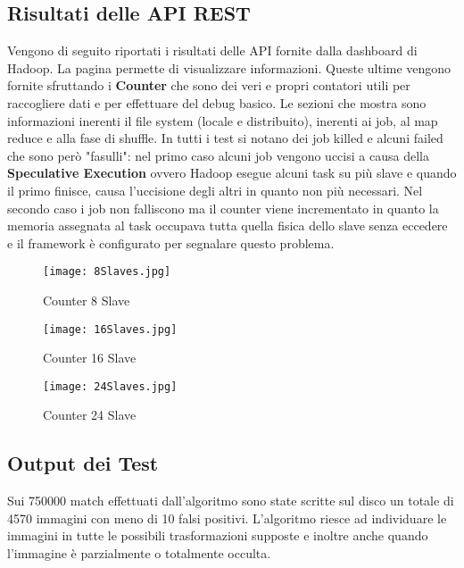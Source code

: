 \subsection{Risultati delle API REST}
Vengono di seguito riportati i risultati delle API fornite dalla dashboard di Hadoop. La pagina permette di visualizzare informazioni. Queste ultime vengono fornite sfruttando i \textbf{Counter} che sono dei veri e propri contatori utili per raccogliere dati e per effettuare del debug basico. Le sezioni che mostra sono informazioni inerenti il file system (locale e distribuito), inerenti ai job, al map reduce e alla fase di shuffle. In tutti i test si notano dei job killed e alcuni failed che sono però "fasulli": nel primo caso alcuni job vengono uccisi a causa della \textbf{Speculative Execution} ovvero Hadoop esegue alcuni task su più slave e quando il primo finisce, causa l'uccisione degli altri in quanto non più necessari. Nel secondo caso i job non falliscono ma il counter viene incrementato in quanto la memoria assegnata al task occupava tutta quella fisica dello slave senza eccedere e il framework è configurato per segnalare questo problema.

\begin{figure}
  \texttt{[image: 8Slaves.jpg]}
  \caption{Counter 8 Slave}
  \label{fg:8Slaves.jpg}
\end{figure}

\begin{figure}
  \texttt{[image: 16Slaves.jpg]}
  \caption{Counter 16 Slave}
  \label{fg:16Slaves.jpg}
\end{figure}

\begin{figure}
  \texttt{[image: 24Slaves.jpg]}
  \label{fg:24Slaves.jpg}
  \caption{Counter 24 Slave}
\end{figure}

\subsection{Output dei Test}
Sui 750000 match effettuati dall'algoritmo sono state scritte sul disco un totale di 4570 immagini con meno di 10 falsi positivi. L'algoritmo riesce ad individuare le immagini in tutte le possibili trasformazioni supposte e inoltre anche quando l'immagine è parzialmente o totalmente occulta.

